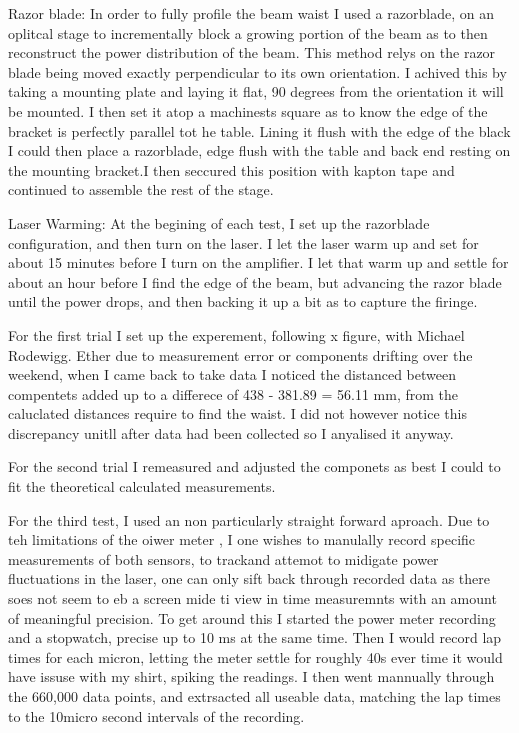 \documentclass[11pt, letterpaper]{article}
\begin{document}
Razor blade: In order to fully profile the beam waist I used a razorblade, on an oplitcal stage to incrementally block a growing portion of the beam as to then reconstruct the power distribution of the beam. This method
relys on the razor blade being moved exactly perpendicular to its own orientation. I achived this by taking a mounting plate 
and laying it flat, 90 degrees from the orientation it will be mounted. I then set it atop a machinests square as to know 
the edge of the bracket is perfectly parallel tot he table. Lining it flush with the edge of the black I could then place a 
razorblade, edge flush with the table and back end resting on the mounting bracket.I then seccured this position with kapton 
tape and continued to assemble the rest of the stage.    

Laser Warming: At the begining of each test, I set up the razorblade configuration, and then turn on the laser. I let the laser warm up and set for about 15 minutes before I turn on the amplifier. I let that warm up and settle for about an hour before I find the edge of the beam, but advancing the razor blade until the power drops, and then backing it up a bit as to capture the firinge. 

For the first trial I set up the experement, following x figure, with Michael Rodewigg. Ether due to measurement error or 
components drifting over the weekend, when I came back to take data I noticed the distanced between compentets added up 
to a differece of  438 - 381.89  = 56.11 mm, from the caluclated distances require to find the waist. I did not however notice this
discrepancy unitll after data had been collected so I anyalised it anyway.

For the second trial I remeasured and adjusted the componets as best I could to fit the theoretical calculated measurements. 


For the third test, I used an non particularly straight forward aproach. Due to teh  limitations of the oiwer meter , I one wishes to manulally record specific measurements of both sensors, to trackand attemot to midigate power fluctuations in the laser, one can only sift back through recorded data as there soes not seem to eb a screen mide ti view in time measuremnts with an amount of meaningful precision.
To get around this I started the power meter recording and a stopwatch, precise up to 10 ms at the same time. Then I would record lap times for each micron, letting the meter settle for roughly 40s ever time it would have issuse with my shirt, spiking the readings. 
I then went mannually through the 660,000 data points, and extrsacted all useable data, matching the lap times to the 10micro second intervals of the recording.
\end{document}
